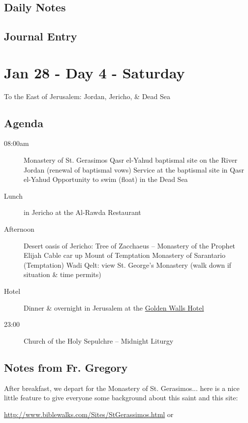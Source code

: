 \documentclass[letterpaper]{report}
\begin{document}
\clearpage
\subsection{Daily Notes}

\clearpage
\subsection{Journal Entry}

\clearpage
\section{Jan 28 - Day 4 - Saturday}
To the East of Jerusalem: Jordan, Jericho, \& Dead Sea

\subsection{Agenda}
\begin{description}
	\item[08:00am]  Monastery of St. Gerasimos
	  \subitem Qasr el-Yahud baptismal site on the River Jordan
	    (renewal of baptismal vows)
	  \subitem Service at the baptismal site in Qasr el-Yahud
	  \subitem Opportunity to swim (float) in the Dead Sea
	\item[Lunch] in Jericho at the Al-Rawda Restaurant 
	\item[Afternoon] Desert oasis of Jericho: Tree of Zacchaeus – Monastery of the Prophet Elijah
	  \subitem Cable car up Mount of Temptation
	  \subitem Monastery of Sarantario (Temptation)
	  \subitem Wadi Qelt: view St. George's Monastery (walk down if situation \& time permits) 
	\item[Hotel] Dinner \& overnight in Jerusalem at the
	  \href{http://goldenwalls.com/}{Golden Walls Hotel}
	\item[23:00]  Church of the Holy Sepulchre – Midnight Liturgy
\end{description}

\subsection{Notes from Fr. Gregory}
After breakfast, we depart for the Monastery of St. Gerasimos...
here is a nice little feature to give everyone some background about this
saint and this site:

\url{http://www.biblewalks.com/Sites/StGerassimos.html}
or
\end{document}
